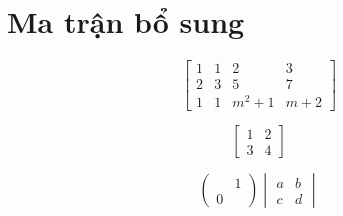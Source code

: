 \documentclass[12pt,a4paper]{article}
\begin{document}
\section*{Ma trận bổ sung}
\[ \left[\begin{array}{ccc|c}1&1&2&3\\2&3&5&7\\1&1&m^{2}+1&m+2\end{array}\right] \]

\[ \left[\begin{array}{c|c}1&2\\3&4\end{array}\right] \]

\[ \begin{pmatrix}{}&1\\0&{}\end{pmatrix}\begin{vmatrix}a&b\\c&d\end{vmatrix} \]
\end{document}
